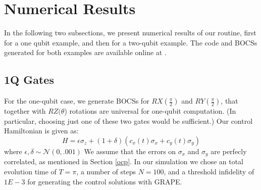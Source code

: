 \documentclass[aps,nofootinbib,pra,notitlepage,twocolumn]{revtex4-1}
\begin{document}

\section{Numerical Results}\label{numerical}
In the following two subsections, we present numerical results of our routine, first for a one qubit example, and then for a two-qubit example. The code and BOCSs generated for both examples are available online at \cite{decorrelating_errors}.
\subsection{1Q Gates}\label{1Q Gates}
 For the one-qubit case, we generate BOCSs for $RX(\frac{\pi}{2})$ and $RY(\frac{\pi}{2})$, that together with $RZ(\theta$) rotations are universal for one-qubit computation. (In particular, choosing just one of these two gates would be sufficient.) Our control Hamiltonian is given as:
\begin{equation}\label{eq:1Qham}
  H = \epsilon\sigma_z + (1 + \delta)(c_x(t)\sigma_x + c_y(t)\sigma_y)
\end{equation}
where $\epsilon, \delta \sim \mathcal{N}(0, .001)$ We assume that the errors on $\sigma_x$ and $\sigma_y$ are perfecly correlated, as mentioned in Section \ref{ocp}. In our simulation we chose an total evolution time of $T=\pi$, a number of steps $N=100$, and a threshold infidelity of $1E-3$ for generating the control solutions with GRAPE.

\end{document}
